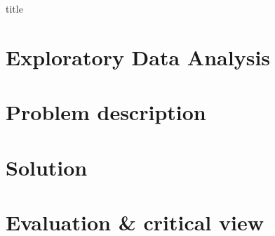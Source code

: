 \documentclass[12pt]{article}
\begin{document}

{title}


\tableofcontents

\restoregeometry
{}

\section{Exploratory Data Analysis}
\section{Problem description}
\section{Solution}
\section{Evaluation \& critical view}
\end{document}
